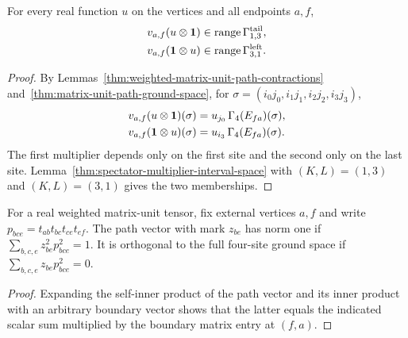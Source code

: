 \begin{lemma}
    \label{thm:fnw-marked-path-interval-spaces}
    \leanok
    For every real function $u$ on the vertices and all endpoints $a,f$,
    \begin{align}
        v_{a,f}(u\otimes\mathbf 1)
         & \in\operatorname{range}\Gamma^{\mathrm{tail}}_{1,3}, \notag \\
        v_{a,f}(\mathbf 1\otimes u)
         & \in\operatorname{range}\Gamma^{\mathrm{left}}_{3,1}. \notag
    \end{align}
\end{lemma}
\begin{proof}\leanok
    By Lemmas~\ref{thm:weighted-matrix-unit-path-contractions}
    and~\ref{thm:matrix-unit-path-ground-space}, for
    $\sigma=(i_0j_0,i_1j_1,i_2j_2,i_3j_3)$,
    \begin{align}
        v_{a,f}(u\otimes\mathbf 1)(\sigma)
         & =u_{j_0}\,\Gamma_4(E_{fa})(\sigma), \notag \\
        v_{a,f}(\mathbf 1\otimes u)(\sigma)
         & =u_{i_3}\,\Gamma_4(E_{fa})(\sigma). \notag
    \end{align}
    The first multiplier depends only on the first site and the second only
    on the last site. Lemma~\ref{thm:spectator-multiplier-interval-space}
    with $(K,L)=(1,3)$ and $(K,L)=(3,1)$ gives the two memberships.
\end{proof}

\begin{lemma}
    \label{thm:fnw-path-vector-norm-orthogonal}
    \leanok
    For a real weighted matrix-unit tensor, fix external vertices $a,f$ and
    write $p_{bce}=t_{ab}t_{bc}t_{ce}t_{ef}$. The path vector with mark $z_{be}$
    has norm one if $\sum_{b,c,e}z_{be}^2p_{bce}^2=1$. It is orthogonal to
    the full four-site ground space if $\sum_{b,c,e}z_{be}p_{bce}^2=0$.
\end{lemma}
\begin{proof}\leanok
    Expanding the self-inner product of the path vector and its inner product
    with an arbitrary boundary vector shows that the latter equals the
    indicated scalar sum multiplied by the boundary matrix entry at $(f,a)$.
\end{proof}

